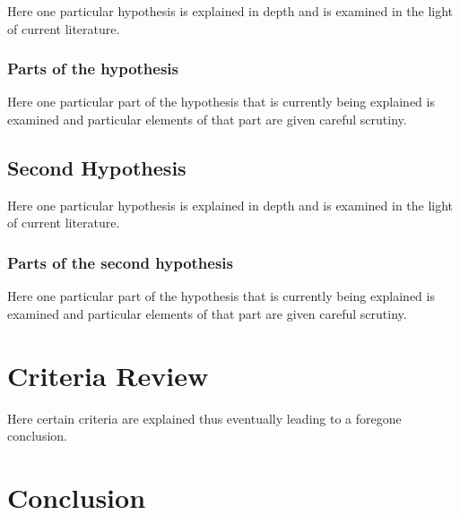 Here one particular hypothesis is explained in depth
and is examined in the light of current literature.

\subsubsection{Parts of the hypothesis}

Here one particular part of the hypothesis that is 
currently being explained is examined and particular
elements of that part are given careful scrutiny.


\subsection{Second Hypothesis}

Here one particular hypothesis is explained in depth
and is examined in the light of current literature.

\subsubsection{Parts of the second hypothesis}

Here one particular part of the hypothesis that is 
currently being explained is examined and particular
elements of that part are given careful scrutiny.


\section{Criteria Review}

Here certain criteria are explained thus eventually
leading to a foregone conclusion.

\section{Conclusion}\label{Conclusion1}

